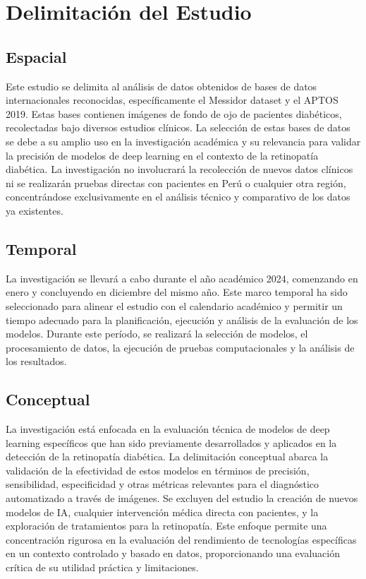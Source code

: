 \section{Delimitación del Estudio}

\subsection{Espacial}
Este estudio se delimita al análisis de datos obtenidos de bases de datos internacionales reconocidas, específicamente el Messidor dataset y el APTOS 2019. Estas bases contienen imágenes de fondo de ojo de pacientes diabéticos, recolectadas bajo diversos estudios clínicos. La selección de estas bases de datos se debe a su amplio uso en la investigación académica y su relevancia para validar la precisión de modelos de deep learning en el contexto de la retinopatía diabética. La investigación no involucrará la recolección de nuevos datos clínicos ni se realizarán pruebas directas con pacientes en Perú o cualquier otra región, concentrándose exclusivamente en el análisis técnico y comparativo de los datos ya existentes.

\subsection{Temporal}
La investigación se llevará a cabo durante el año académico 2024, comenzando en enero y concluyendo en diciembre del mismo año. Este marco temporal ha sido seleccionado para alinear el estudio con el calendario académico y permitir un tiempo adecuado para la planificación, ejecución y análisis de la evaluación de los modelos. Durante este período, se realizará la selección de modelos, el procesamiento de datos, la ejecución de pruebas computacionales y la análisis de los resultados.

\subsection{Conceptual}
La investigación está enfocada en la evaluación técnica de modelos de deep learning específicos que han sido previamente desarrollados y aplicados en la detección de la retinopatía diabética. La delimitación conceptual abarca la validación de la efectividad de estos modelos en términos de precisión, sensibilidad, especificidad y otras métricas relevantes para el diagnóstico automatizado a través de imágenes. Se excluyen del estudio la creación de nuevos modelos de IA, cualquier intervención médica directa con pacientes, y la exploración de tratamientos para la retinopatía. Este enfoque permite una concentración rigurosa en la evaluación del rendimiento de tecnologías específicas en un contexto controlado y basado en datos, proporcionando una evaluación crítica de su utilidad práctica y limitaciones.

